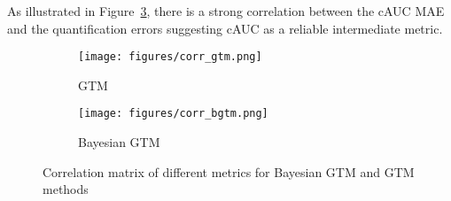As illustrated in Figure~\ref{fig:corr_mat}, there is a strong correlation between the cAUC MAE and the quantification errors suggesting cAUC as a reliable intermediate metric.

\begin{figure}[h]
	\centering
	\begin{subfigure}{0.45\textwidth}
		\texttt{[image: figures/corr\_gtm.png]}
		\caption{GTM}
		\label{subfig:corr_gtm}
	\end{subfigure}
	\begin{subfigure}{0.45\textwidth}
		\texttt{[image: figures/corr\_bgtm.png]}
		\caption{Bayesian GTM}
		\label{subfig:corr_bgtm}
	\end{subfigure}
	\caption{Correlation matrix of different metrics for Bayesian GTM and GTM methods}
	\label{fig:corr_mat}
\end{figure}



